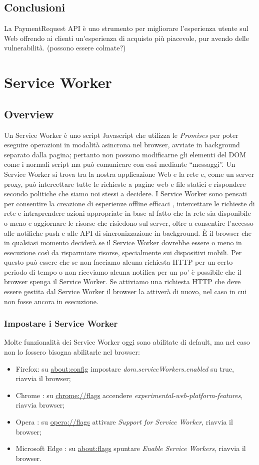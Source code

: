 \documentclass[11pt ,a4paper , twoside , openright ]{article}
\begin{document}
\subsection{Conclusioni}
La PaymentRequest API è uno strumento per migliorare l'esperienza utente sul Web offrendo ai clienti un'esperienza di acquisto più piacevole, pur avendo delle vulnerabilità. (possono essere colmate?)
\newpage
\cleardoublepage
\section{Service Worker}
\subsection{Overview}
Un Service Worker \cite{rif23, rif24, rif25} è uno script Javascript che utilizza le \textit{Promises} \cite{rif27} per poter eseguire operazioni in modalità asincrona nel browser, avviate in background separato dalla pagina; pertanto non possono modificarne gli elementi del DOM come i normali script ma può comunicare con essi mediante “messaggi”.
Un Service Worker si trova tra la nostra applicazione Web e la rete e, come un server proxy, può intercettare tutte le richieste a pagine web e file statici e rispondere secondo politiche che siamo noi stessi a decidere.
I Service Worker sono pensati per consentire la creazione di esperienze offline efficaci \cite{rif28}, intercettare le richieste di rete e intraprendere azioni appropriate in base al fatto che la rete sia disponibile o meno e aggiornare le risorse che risiedono sul server, oltre a consentire l'accesso alle notifiche push e alle API di sincronizzazione in background.
È il browser che in qualsiasi momento deciderà se il Service Worker dovrebbe essere o meno in esecuzione così da risparmiare risorse, specialmente sui dispositivi mobili. Per questo può essere che se non facciamo alcuna richiesta HTTP per un certo periodo di tempo o non riceviamo alcuna notifica per un po' è possibile che il browser spenga il Service Worker. Se attiviamo una richiesta HTTP che deve essere gestita dal Service Worker il browser la attiverà di nuovo, nel caso in cui non fosse ancora in esecuzione. 

\subsubsection{Impostare i Service Worker \cite{rif22}}
Molte funzionalità dei Service Worker oggi sono abilitate di default, ma nel caso non lo fossero bisogna abilitarle nel browser:
\begin{itemize}
	\item Firefox: su \url{about:config} impostare \textit{dom.serviceWorkers.enabled} su true, riavvia il browser;
	\item Chrome : su \url{chrome://flags} accendere  \textit{experimental-web-platform-features}, riavvia browser;
	\item Opera : su \url{opera://flags} attivare \textit{Support for Service Worker}, riavvia il browser;
	\item Microsoft Edge : su \url{about:flags} spuntare  \textit{Enable Service Workers}, riavvia il browser.
\end{itemize}
\end{document}
